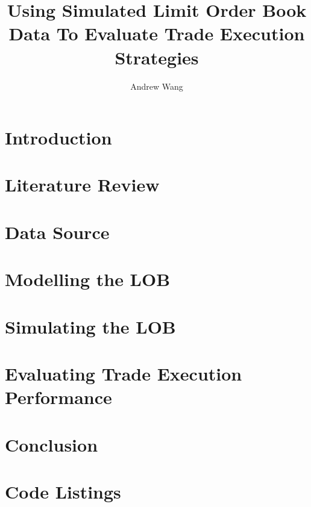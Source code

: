 \documentclass[12pt,lot,lol,lof]{puthesis_undergraduate}
\title{Using Simulated Limit Order Book Data To Evaluate Trade Execution Strategies}
\author{Andrew Wang}
\begin{document}
\chapter{Introduction}\label{ch:intro}


\chapter{Literature Review}\label{ch:litreview}


\chapter{Data Source}\label{ch:data_source}


\chapter{Modelling the LOB}\label{ch:experiment}


\chapter{Simulating the LOB} \label{ch:simulation}


\chapter{Evaluating Trade Execution Performance} \label{ch:trade_execution}


\chapter{Conclusion}


\appendix
\chapter{Code Listings}



 \label{bib}
\end{document}
